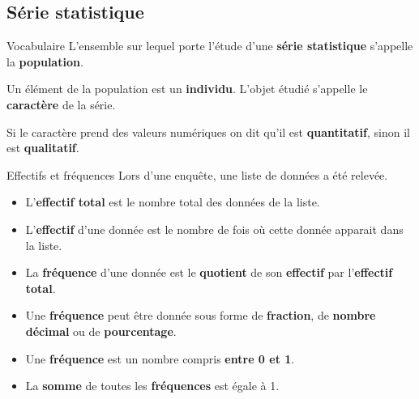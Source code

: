 
\begin{pageCours} %


\section{Série statistique}

\begin{DefT}{Vocabulaire}
L'ensemble sur lequel porte l'étude d'une \textbf{série statistique} s'appelle la \textbf{population}.

Un élément de la population est un \textbf{individu}. L'objet étudié s'appelle le \textbf{caractère} de la série.

Si le caractère prend des valeurs numériques on dit qu'il est \textbf{quantitatif}, sinon il est \textbf{qualitatif}.
\end{DefT}

\begin{DefT}{Effectifs et fréquences}
Lors d'une enquête, une liste de données a été relevée.
\begin{itemize}
\item L'\textbf{effectif total} est le nombre total des données de la liste.
\item L'\textbf{effectif} d'une donnée est le nombre de fois où cette donnée apparait dans la liste.
\item La \textbf{fréquence} d'une donnée est le \textbf{quotient} de son \textbf{effectif} par l'\textbf{effectif total}.
\end{itemize}
\end{DefT}

\begin{Pp}
\begin{itemize}
\item Une \textbf{fréquence} peut être donnée sous forme de \textbf{fraction}, de \textbf{nombre décimal} ou de \textbf{pourcentage}.
\item Une \textbf{fréquence} est un nombre compris \textbf{entre 0 et 1}.
\item La \textbf{somme} de toutes les \textbf{fréquences} est égale à 1.
\end{itemize}
\end{Pp}


\end{pageCours}
